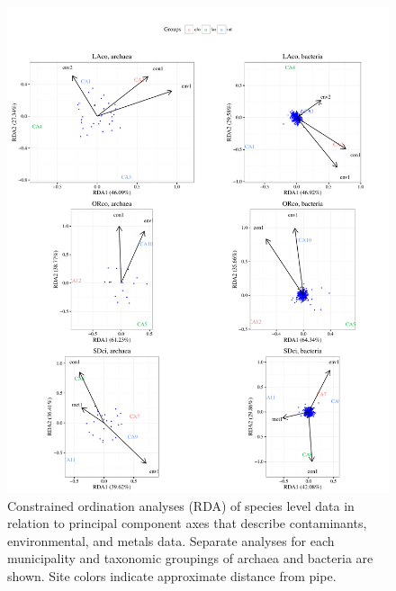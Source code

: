 \documentclass[letterpaper,12pt]{article}\usepackage[]{graphicx}\usepackage[]{color}
\newenvironment{knitrout}{}{} %
\begin{document}
\begin{knitrout}
\color{fgcolor}\begin{figure}[!ht]

{\centering \includegraphics[width=\textwidth]{figs/unnamed-chunk-9-1} 

}

\caption[Constrained ordination analyses (RDA) of species level data in relation to principal component axes that describe contaminants, environmental, and metals data]{Constrained ordination analyses (RDA) of species level data in relation to principal component axes that describe contaminants, environmental, and metals data.  Separate analyses for each municipality and taxonomic groupings of archaea and bacteria are shown.  Site colors indicate approximate distance from pipe.}\label{fig:unnamed-chunk-9}
\end{figure}


\end{knitrout}
\end{document}
